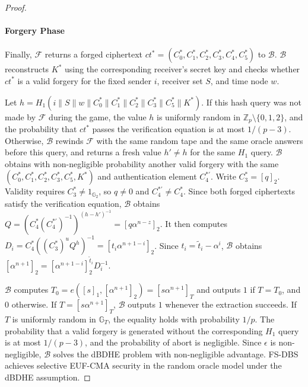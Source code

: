 \documentclass[sigconf,anonymous]{acmart}
\theoremstyle{definition}
\theoremstyle{definition}
\theoremstyle{definition}
\theoremstyle{definition}
\theoremstyle{definition}
\theoremstyle{definition}
\theoremstyle{definition}
\theoremstyle{definition}
\theoremstyle{definition}
\begin{document}
\begin{proof}
\begin{itemize}
	\end{itemize}
	
\paragraph{\textbf{Forgery Phase}}
Finally, $\mathcal{F}$ returns a forged ciphertext
$ct^*=(C_0^*,C_1^*,C_2^*,C_3^*,C_4^*,C_5^*)$ to $\mathcal{B}$.
$\mathcal{B}$ reconstructs $K^*$ using the corresponding receiver's
secret key and checks whether $ct^*$ is a valid forgery for the fixed
sender $i$, receiver set $S$, and time node $w$.

Let $h=H_1(i\parallel S\parallel w\parallel C_0^*\parallel C_1^*
\parallel C_2^*\parallel C_3^*\parallel C_5^*\parallel K^*)$.
If this hash query was not made by $\mathcal{F}$ during the game,
the value $h$ is uniformly random in
$\mathbb{Z}_p\setminus\{0,1,2\}$, and the probability that $ct^*$ passes
the verification equation is at most $1/(p-3)$. Otherwise, $\mathcal{B}$ rewinds $\mathcal{F}$ with the same random
tape and the same oracle answers before this query, and returns a fresh
value $h'\neq h$ for the same $H_1$ query. 
$\mathcal{B}$ obtains with non-negligible probability another valid
forgery with the same
$(C_0^*,C_1^*,C_2^*,C_3^*,C_5^*,K^*)$
and authentication element $C_4^{*\prime}$.
Write $C_3^*=[q]_2$. Validity requires
$C_3^*\neq 1_{\mathbb{G}_2}$, so $q\neq 0$ and
$C_4^{*\prime}\neq C_4^*$. Since both forged ciphertexts satisfy the
verification equation, $\mathcal{B}$ obtains
$Q=(C_4^*(C_4^{*\prime})^{-1})^{(h-h')^{-1}}
=[q\alpha^{n-z}]_2$.
It then computes
$D_i=C_4^*((C_3^*)^uQ^h)^{-1}
=[t_i\alpha^{n+1-i}]_2$.
Since $t_i=\widetilde t_i-\alpha^i$, $\mathcal{B}$ obtains
$[\alpha^{n+1}]_2=
[\alpha^{n+1-i}]_2^{\widetilde t_i}D_i^{-1}$.

$\mathcal{B}$ computes
$T_0=e([s]_1,[\alpha^{n+1}]_2)=[s\alpha^{n+1}]_T$
and outputs $1$ if $T=T_0$, and $0$ otherwise.
If $T=[s\alpha^{n+1}]_T$, $\mathcal{B}$ outputs $1$ whenever the
extraction succeeds. If $T$ is uniformly random in $\mathbb{G}_T$,
the equality holds with probability $1/p$.
The probability that a valid forgery is generated without the
corresponding $H_1$ query is at most $1/(p-3)$, and the probability
of abort is negligible.
Since $\epsilon$ is non-negligible, $\mathcal{B}$ solves the dBDHE
problem with non-negligible advantage.  FS-DBS achieves selective EUF-CMA security in the random
oracle model under the dBDHE assumption.
\end{proof}
\end{document}
